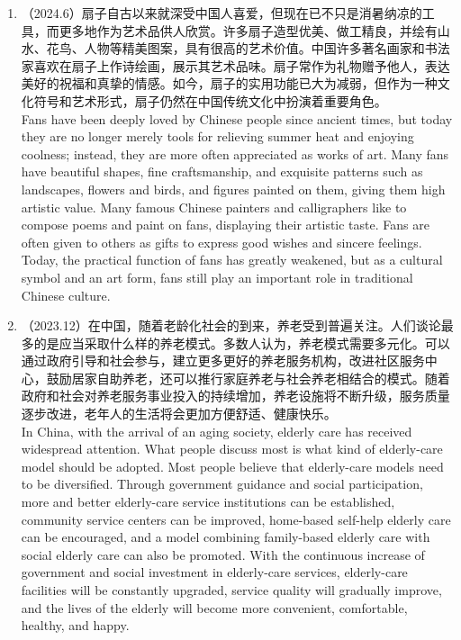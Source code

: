 ﻿\documentclass[lang=cn,11pt]{elegantbook}
\begin{document}
\begin{enumerate}
    \item （2024.6）扇子自古以来就深受中国人喜爱，但现在已不只是消暑纳凉的工具，而更多地作为艺术品供人欣赏。许多扇子造型优美、做工精良，并绘有山水、花鸟、人物等精美图案，具有很高的艺术价值。中国许多著名画家和书法家喜欢在扇子上作诗绘画，展示其艺术品味。扇子常作为礼物赠予他人，表达美好的祝福和真挚的情感。如今，扇子的实用功能已大为减弱，但作为一种文化符号和艺术形式，扇子仍然在中国传统文化中扮演着重要角色。\\Fans have been deeply loved by Chinese people since ancient times, but today they are no longer merely tools for relieving summer heat and enjoying coolness; instead, they are more often appreciated as works of art. Many fans have beautiful shapes, fine craftsmanship, and exquisite patterns such as landscapes, flowers and birds, and figures painted on them, giving them high artistic value. Many famous Chinese painters and calligraphers like to compose poems and paint on fans, displaying their artistic taste. Fans are often given to others as gifts to express good wishes and sincere feelings. Today, the practical function of fans has greatly weakened, but as a cultural symbol and an art form, fans still play an important role in traditional Chinese culture.
    \item （2023.12）在中国，随着老龄化社会的到来，养老受到普遍关注。人们谈论最多的是应当采取什么样的养老模式。多数人认为，养老模式需要多元化。可以通过政府引导和社会参与，建立更多更好的养老服务机构，改进社区服务中心，鼓励居家自助养老，还可以推行家庭养老与社会养老相结合的模式。随着政府和社会对养老服务事业投入的持续增加，养老设施将不断升级，服务质量逐步改进，老年人的生活将会更加方便舒适、健康快乐。\\In China, with the arrival of an aging society, elderly care has received widespread attention. What people discuss most is what kind of elderly-care model should be adopted. Most people believe that elderly-care models need to be diversified. Through government guidance and social participation, more and better elderly-care service institutions can be established, community service centers can be improved, home-based self-help elderly care can be encouraged, and a model combining family-based elderly care with social elderly care can also be promoted. With the continuous increase of government and social investment in elderly-care services, elderly-care facilities will be constantly upgraded, service quality will gradually improve, and the lives of the elderly will become more convenient, comfortable, healthy, and happy.

\end{enumerate}
\end{document}

